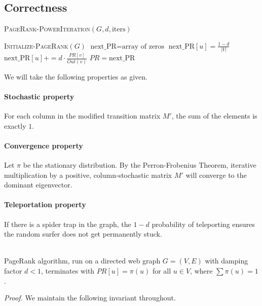 \documentclass[11pt]{exam}
\begin{document}
	\subsection{Correctness}
	\vspace{-20pt}
	\begin{algorithm}
		\textsc{PageRank-PowerIteration}$(G, d, \text{iters})$
		\begin{algorithmic}
			\State \textsc{Initialize-PageRank}$(G)$
			\State $\text{next\_PR} = \text{array of zeros}$
			\State $\text{next\_PR}[u] = \frac{1-d}{|V|}$
			\State $\text{next\_PR}[u] += d \cdot \frac{PR[v]}{Out(v)}$
			\EndFor
			\EndFor
			\State $PR = \text{next\_PR}$
			\EndFor
		\end{algorithmic}
	\end{algorithm}
	We will take the following properties as given.
	
	\paragraph{Stochastic property}
	For each column in the modified transition matrix $M'$, the sum of the elements is exactly $1$.\\
	
	\paragraph{Convergence property}
	Let $\pi$ be the stationary distribution. By the Perron-Frobenius Theorem, iterative multiplication by a positive, column-stochastic matrix $M'$ will converge to the dominant eigenvector.\\
	
	\paragraph{Teleportation property}
	If there is a spider trap in the graph, the $1-d$ probability of teleporting ensures the random surfer does not get permanently stuck. \\ \\
	
	
	\begin{theorem}
		PageRank algorithm, run on a directed web graph $G = (V,E)$ with damping factor $d < 1$, terminates with $PR[u] = \pi(u)$ for all $u \in V$, where $\sum \pi(u) = 1$.
	\end{theorem}
	\textit{Proof.} We maintain the following invariant throughout. \\
	
\end{document}

